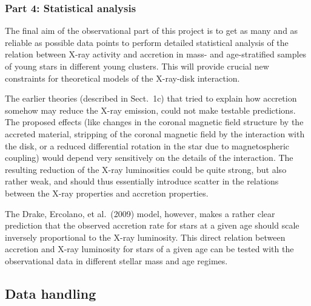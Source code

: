 \documentclass[10pt,fleqn,twoside,a4paper]{article}
\begin{document}
\subsubsection*{Part 4:  Statistical analysis}


The final aim of the observational part of this project is to get as many and as reliable as 
possible data points to perform
 detailed statistical analysis
of the relation between X-ray activity and accretion in mass- and age-stratified
samples of young stars in different young clusters. This
will provide crucial new
constraints for theoretical models of the X-ray-disk interaction.

The earlier theories (described in Sect.~1c) that tried to explain how
accretion somehow may reduce the X-ray emission, 
could not make testable predictions.
The proposed effects (like changes in the coronal magnetic field structure by the
accreted material, stripping of the coronal magnetic field 
by the interaction with the disk, or a reduced differential rotation in the star
due to magnetospheric coupling) would depend very sensitively on the details
of the interaction. The resulting reduction of the X-ray luminosities could
be quite strong, but also rather weak, and should thus essentially introduce
scatter in the relations between the X-ray properties and accretion properties.

The Drake, Ercolano, et al.~(2009) model, however, makes a rather clear
prediction that the observed accretion rate for stars at a given age
should scale inversely proportional to the X-ray luminosity.
This direct relation between accretion and X-ray luminosity for stars of a given
age can be tested with
the observational data in different stellar mass and age regimes.


\subsection{Data handling}
\end{document}
